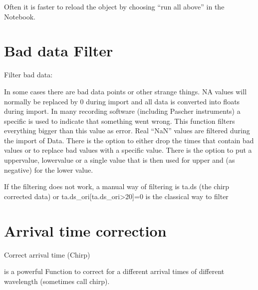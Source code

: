 \documentclass[letterpaper,10pt,english]{sphinxmanual}
\begin{document}
\begin{sphinxVerbatim}[commandchars=\\\{\}]
  
  
\end{sphinxVerbatim}

Often it is faster to reload the object by choosing “run all above” in the
Notebook.


\section{Bad data Filter}
\label{\detokenize{Shaping:bad-data-filter}}
Filter bad data:                                {\hyperref[\detokenize{plot_func:plot_func.TA.Filter_data}]{}}

In some cases there are bad data points or other strange things. NA
values will normally be replaced by 0 during import and all data is
converted into floats during import. In many recording software
(including Pascher instruments) a specific  is used to indicate
that something went wrong. This function filters everything bigger than
this value as error. Real “NaN” values are filtered during the import of Data.
There is the option to either drop the times that contain bad values or to replace
bad values with a specific value. There is the option to put a uppervalue, lowervalue
or a single value that is then used for upper and (as negative) for the lower value.

If the filtering does not work, a manual way of filtering is
ta.ds (the chirp corrected data) or ta.ds\_ori{[}ta.ds\_ori\textgreater{}20{]}=0 is the classical way to filter


\section{Arrival time correction}
\label{\detokenize{Shaping:arrival-time-correction}}
Correct arrival time (Chirp)    {\hyperref[\detokenize{plot_func:plot_func.TA.Cor_Chirp}]{}}

 is a powerful Function to correct for a different arrival times of
different wavelength (sometimes call chirp).
\end{document}
